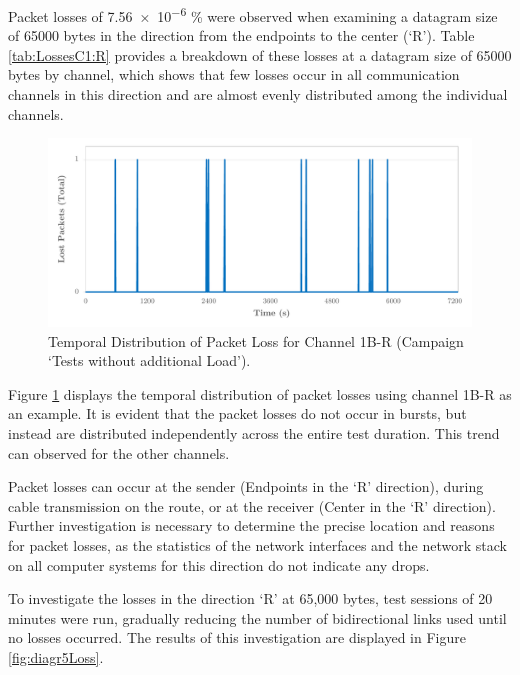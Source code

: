 Packet losses of \num{7.56e-6} \% were observed when examining a datagram size of 65000 bytes in the direction from the endpoints to the center (`R'). Table \ref{tab:LossesC1:R} provides a breakdown of these losses at a datagram size of 65000 bytes by channel, which shows that few losses occur in all communication channels in this direction and are almost evenly distributed among the individual channels.


\begin{figure}[h!]
    \centering
    \includegraphics[width=1\linewidth]{figures/reliability/ihawk/diagr4.pdf}
    \caption{Temporal Distribution of Packet Loss for Channel 1B-R (Campaign `Tests without additional Load').}
    \label{fig:diagr4Temp}
\end{figure}

Figure \ref{fig:diagr4Temp} displays the temporal distribution of packet losses using channel 1B-R as an example. It is evident that the packet losses do not occur in bursts, but instead are distributed independently across the entire test duration. This trend can observed for the other channels.

Packet losses can occur at the sender (Endpoints in the `R' direction), during cable transmission on the route, or at the receiver (Center in the `R' direction). Further investigation is necessary to determine the precise location and reasons for packet losses, as the statistics of the network interfaces and the network stack on all computer systems for this direction do not indicate any drops.

To investigate the losses in the direction `R' at 65,000 bytes, test sessions of 20 minutes were run, gradually reducing the number of bidirectional links used until no losses occurred. The results of this investigation are displayed in Figure \ref{fig:diagr5Loss}.


